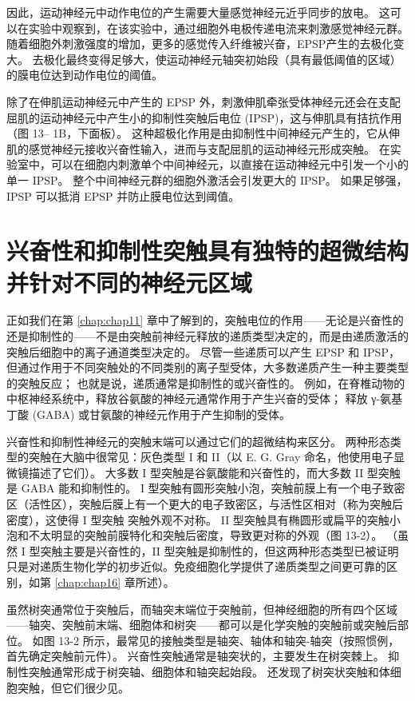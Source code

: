 因此，运动神经元中动作电位的产生需要大量感觉神经元近乎同步的放电。 
这可以在实验中观察到，在该实验中，通过细胞外电极传递电流来刺激感觉神经元群。 
随着细胞外刺激强度的增加，更多的感觉传入纤维被兴奋，EPSP产生的去极化变大。
去极化最终变得足够大，使运动神经元轴突初始段（具有最低阈值的区域）的膜电位达到动作电位的阈值。


除了在伸肌运动神经元中产生的 EPSP 外，刺激伸肌牵张受体神经元还会在支配屈肌的运动神经元中产生小的抑制性突触后电位 (IPSP)，这与伸肌具有拮抗作用（图 13– 1B，下面板）。 
这种超极化作用是由抑制性中间神经元产生的，它从伸肌的感觉神经元接收兴奋性输入，进而与支配屈肌的运动神经元形成突触。 
在实验室中，可以在细胞内刺激单个中间神经元，以直接在运动神经元中引发一个小的单一 IPSP。 
整个中间神经元群的细胞外激活会引发更大的 IPSP。 
如果足够强，IPSP 可以抵消 EPSP 并防止膜电位达到阈值。



\section{兴奋性和抑制性突触具有独特的超微结构并针对不同的神经元区域}
正如我们在第 \ref{chap:chap11} 章中了解到的，突触电位的作用——无论是兴奋性的还是抑制性的——不是由突触前神经元释放的递质类型决定的，而是由递质激活的突触后细胞中的离子通道类型决定的。 
尽管一些递质可以产生 EPSP 和 IPSP，但通过作用于不同突触处的不同类别的离子型受体，大多数递质产生一种主要类型的突触反应； 也就是说，递质通常是抑制性的或兴奋性的。 
例如，在脊椎动物的中枢神经系统中，释放谷氨酸的神经元通常作用于产生兴奋的受体； 
释放 γ-氨基丁酸 (GABA) 或甘氨酸的神经元作用于产生抑制的受体。


兴奋性和抑制性神经元的突触末端可以通过它们的超微结构来区分。 
两种形态类型的突触在大脑中很常见：灰色类型 I 和 II（以 E. G. Gray 命名，他使用电子显微镜描述了它们）。
大多数 I 型突触是谷氨酸能和兴奋性的，而大多数 II 型突触是 GABA 能和抑制性的。
I 型突触有圆形突触小泡，突触前膜上有一个电子致密区（活性区），突触后膜上有一个更大的电子致密区，与活性区相对（称为突触后密度），这使得 I 型突触 突触外观不对称。 
II 型突触具有椭圆形或扁平的突触小泡和不太明显的突触前膜特化和突触后密度，导致更对称的外观（图 13-2）。 
（虽然 I 型突触主要是兴奋性的，II 型突触是抑制性的，但这两种形态类型已被证明只是对递质生物化学的初步近似。免疫细胞化学提供了递质类型之间更可靠的区别，如第 \ref{chap:chap16} 章所述）。


虽然树突通常位于突触后，而轴突末端位于突触前，但神经细胞的所有四个区域——轴突、突触前末端、细胞体和树突——都可以是化学突触的突触前或突触后部位。 
如图 13-2 所示，最常见的接触类型是轴突、轴体和轴突-轴突（按照惯例，首先确定突触前元件）。 
兴奋性突触通常是轴突状的，主要发生在树突棘上。 
抑制性突触通常形成于树突轴、细胞体和轴突起始段。 
还发现了树突状突触和体细胞突触，但它们很少见。


